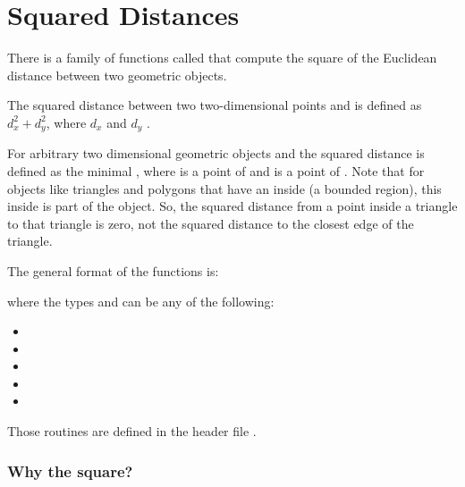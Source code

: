 
\cleardoublepage
\chapter{Squared Distances}

There is a family of functions called  that
compute the square of the Euclidean distance between two geometric objects.

The squared distance between two two-dimensional points  and
 is defined as $d_{x}^{2} + d_{y}^{2}$, where $d_{x}$
\LatexHtml{$\equiv$}{==}
 and $d_{y}$\LatexHtml{$\equiv$}{==} .

For arbitrary two dimensional geometric objects  and
 the squared distance is defined as the minimal
, where  is a point of
 and  is a point of .
Note that for objects like triangles and polygons that have an inside (a
bounded region), this inside is part of the object.
So, the squared distance from a point inside a triangle to that triangle is
zero, not the squared distance to the closest edge of the triangle.

The general format of the functions is:


\noindent
where the types  and  can be any of the
following:
\begin{itemize}
\item {}
\item {}
\item {}
\item {}
\item {}
\end{itemize}

Those routines are defined in the header file
.

\subsection{Why the square?}

